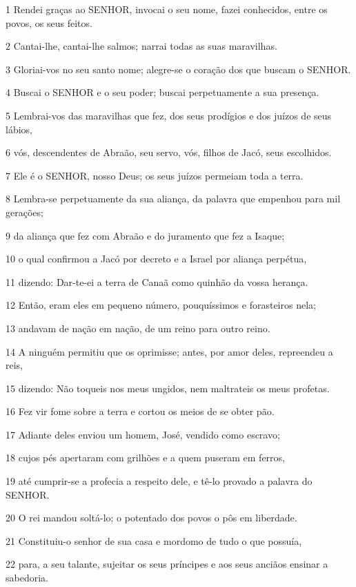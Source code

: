 \par 1 Rendei graças ao SENHOR, invocai o seu nome, fazei conhecidos, entre os povos, os seus feitos.
\par 2 Cantai-lhe, cantai-lhe salmos; narrai todas as suas maravilhas.
\par 3 Gloriai-vos no seu santo nome; alegre-se o coração dos que buscam o SENHOR.
\par 4 Buscai o SENHOR e o seu poder; buscai perpetuamente a sua presença.
\par 5 Lembrai-vos das maravilhas que fez, dos seus prodígios e dos juízos de seus lábios,
\par 6 vós, descendentes de Abraão, seu servo, vós, filhos de Jacó, seus escolhidos.
\par 7 Ele é o SENHOR, nosso Deus; os seus juízos permeiam toda a terra.
\par 8 Lembra-se perpetuamente da sua aliança, da palavra que empenhou para mil gerações;
\par 9 da aliança que fez com Abraão e do juramento que fez a Isaque;
\par 10 o qual confirmou a Jacó por decreto e a Israel por aliança perpétua,
\par 11 dizendo: Dar-te-ei a terra de Canaã como quinhão da vossa herança.
\par 12 Então, eram eles em pequeno número, pouquíssimos e forasteiros nela;
\par 13 andavam de nação em nação, de um reino para outro reino.
\par 14 A ninguém permitiu que os oprimisse; antes, por amor deles, repreendeu a reis,
\par 15 dizendo: Não toqueis nos meus ungidos, nem maltrateis os meus profetas.
\par 16 Fez vir fome sobre a terra e cortou os meios de se obter pão.
\par 17 Adiante deles enviou um homem, José, vendido como escravo;
\par 18 cujos pés apertaram com grilhões e a quem puseram em ferros,
\par 19 até cumprir-se a profecia a respeito dele, e tê-lo provado a palavra do SENHOR.
\par 20 O rei mandou soltá-lo; o potentado dos povos o pôs em liberdade.
\par 21 Constituiu-o senhor de sua casa e mordomo de tudo o que possuía,
\par 22 para, a seu talante, sujeitar os seus príncipes e aos seus anciãos ensinar a sabedoria.
